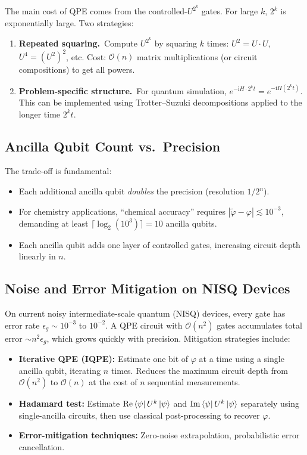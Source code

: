 \documentclass[12pt,a4paper]{article}
\newcommand{\QPE}{\textsc{QPE}}
\newcommand{\ii}{\mathrm{i}}
\newcommand{\bigO}{\mathcal{O}}
\begin{document}
The main cost of \QPE{} comes from the controlled-$U^{2^k}$ gates.  For large
$k$, $2^k$ is exponentially large.  Two strategies:

\begin{enumerate}[label=\textbf{\arabic*.}, leftmargin=*]
  \item \textbf{Repeated squaring.}\ Compute $U^{2^k}$ by squaring $k$ times:
        $U^2 = U\cdot U$, $U^4 = (U^2)^2$, etc.  Cost: $\bigO(n)$
        matrix multiplications (or circuit compositions) to get all powers.
  \item \textbf{Problem-specific structure.}\ For quantum simulation,
        $e^{-\ii H\cdot 2^k t} = e^{-\ii H(2^k t)}$.  This can be implemented
        using Trotter--Suzuki decompositions applied to the longer time $2^k t$.
\end{enumerate}

\subsection{Ancilla Qubit Count vs.\ Precision}

The trade-off is fundamental:
\begin{itemize}[leftmargin=*]
  \item Each additional ancilla qubit \emph{doubles} the precision
        (resolution $1/2^n$).
  \item For chemistry applications, ``chemical accuracy'' requires
        $|\tilde\varphi - \varphi| \lesssim 10^{-3}$, demanding at least
        $\lceil\log_2(10^3)\rceil = 10$ ancilla qubits.
  \item Each ancilla qubit adds one layer of controlled gates, increasing
        circuit depth linearly in $n$.
\end{itemize}

\subsection{Noise and Error Mitigation on NISQ Devices}

On current noisy intermediate-scale quantum (NISQ) devices, every gate has
error rate $\epsilon_g \sim 10^{-3}$ to $10^{-2}$.  A \QPE{} circuit with
$\bigO(n^2)$ gates accumulates total error $\sim n^2\epsilon_g$, which grows
quickly with precision.  Mitigation strategies include:

\begin{itemize}[leftmargin=*]
  \item \textbf{Iterative QPE (IQPE):} Estimate one bit of $\varphi$ at a time
        using a single ancilla qubit, iterating $n$ times.
        Reduces the maximum circuit depth from $\bigO(n^2)$ to $\bigO(n)$
        at the cost of $n$ sequential measurements.
  \item \textbf{Hadamard test:} Estimate $\operatorname{Re}\Bra{\psi}U^k\Ket{\psi}$
        and $\operatorname{Im}\Bra{\psi}U^k\Ket{\psi}$ separately using
        single-ancilla circuits, then use classical post-processing
        to recover $\varphi$.
  \item \textbf{Error-mitigation techniques:} Zero-noise extrapolation,
        probabilistic error cancellation.
\end{itemize}
\end{document}
